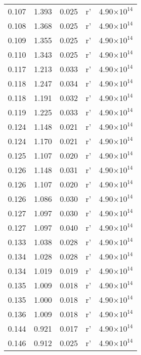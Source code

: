 \documentclass{aa}
\begin{document}
{\begin{longtable}{c|c|c|c|c}
  0.107 &   1.393 &  0.025 & r'        &  4.90$\times 10^{14}$    \\
  0.108 &   1.368 &  0.025 & r'        &  4.90$\times 10^{14}$    \\
  0.109 &   1.355 &  0.025 & r'        &  4.90$\times 10^{14}$    \\
  0.110 &   1.343 &  0.025 & r'        &  4.90$\times 10^{14}$    \\
  0.117 &   1.213 &  0.033 & r'        &  4.90$\times 10^{14}$    \\
  0.118 &   1.247 &  0.034 & r'        &  4.90$\times 10^{14}$    \\
  0.118 &   1.191 &  0.032 & r'        &  4.90$\times 10^{14}$    \\
  0.119 &   1.225 &  0.033 & r'        &  4.90$\times 10^{14}$    \\
  0.124 &   1.148 &  0.021 & r'        &  4.90$\times 10^{14}$    \\
  0.124 &   1.170 &  0.021 & r'        &  4.90$\times 10^{14}$    \\
  0.125 &   1.107 &  0.020 & r'        &  4.90$\times 10^{14}$    \\
  0.126 &   1.148 &  0.031 & r'        &  4.90$\times 10^{14}$    \\
  0.126 &   1.107 &  0.020 & r'        &  4.90$\times 10^{14}$    \\
  0.126 &   1.086 &  0.030 & r'        &  4.90$\times 10^{14}$    \\
  0.127 &   1.097 &  0.030 & r'        &  4.90$\times 10^{14}$    \\
  0.127 &   1.097 &  0.040 & r'        &  4.90$\times 10^{14}$    \\
  0.133 &   1.038 &  0.028 & r'        &  4.90$\times 10^{14}$    \\
  0.134 &   1.028 &  0.028 & r'        &  4.90$\times 10^{14}$    \\
  0.134 &   1.019 &  0.019 & r'        &  4.90$\times 10^{14}$    \\
  0.135 &   1.009 &  0.018 & r'        &  4.90$\times 10^{14}$    \\
  0.135 &   1.000 &  0.018 & r'        &  4.90$\times 10^{14}$    \\
  0.136 &   1.009 &  0.018 & r'        &  4.90$\times 10^{14}$    \\
  0.144 &   0.921 &  0.017 & r'        &  4.90$\times 10^{14}$    \\
  0.146 &   0.912 &  0.025 & r'        &  4.90$\times 10^{14}$    \\

\end{longtable}}
\end{document}
